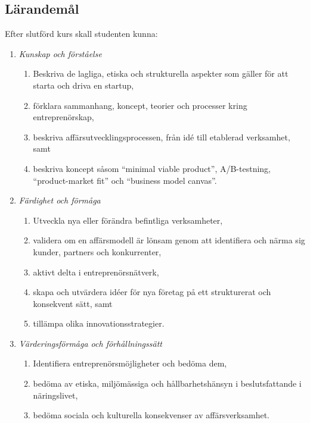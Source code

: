 \subsection*{Lärandemål}

Efter slutförd kurs skall studenten kunna:

\begin{enumerate}
\def\labelenumi{\Alph{enumi}.}
\tightlist
\item
  \emph{Kunskap och förståelse}

  \begin{enumerate}
  \def\labelenumii{\Alph{enumi}.\arabic{enumii}.}
  \tightlist
  \item
    Beskriva de lagliga, etiska och strukturella aspekter som gäller för
    att starta och driva en startup,
  \item
    förklara sammanhang, koncept, teorier och processer kring
    entreprenörskap,
  \item
    beskriva affärsutvecklingsprocessen, från idé till etablerad
    verksamhet, samt
  \item
    beskriva koncept såsom ``minimal viable product'', A/B-testning,
    ``product-market fit'' och ``business model canvas''.
  \end{enumerate}
\item
  \emph{Färdighet och förmåga}

  \begin{enumerate}
  \def\labelenumii{\Alph{enumi}.\arabic{enumii}.}
  \tightlist
  \item
    Utveckla nya eller förändra befintliga verksamheter,
  \item
    validera om en affärsmodell är lönsam genom att identifiera och
    närma sig kunder, partners och konkurrenter,
  \item
    aktivt delta i entreprenörsnätverk,
  \item
    skapa och utvärdera idéer för nya företag på ett strukturerat och
    konsekvent sätt, samt
  \item
    tillämpa olika innovationsstrategier.
  \end{enumerate}
\item
  \emph{Värderingsförmåga och förhållningssätt}

  \begin{enumerate}
  \def\labelenumii{\Alph{enumi}.\arabic{enumii}.}
  \tightlist
  \item
    Identifiera entreprenörsmöjligheter och bedöma dem,
  \item
    bedöma av etiska, miljömässiga och hållbarhetshänsyn i
    beslutsfattande i näringslivet,
  \item
    bedöma sociala och kulturella konsekvenser av affärsverksamhet.
  \end{enumerate}
\end{enumerate}

